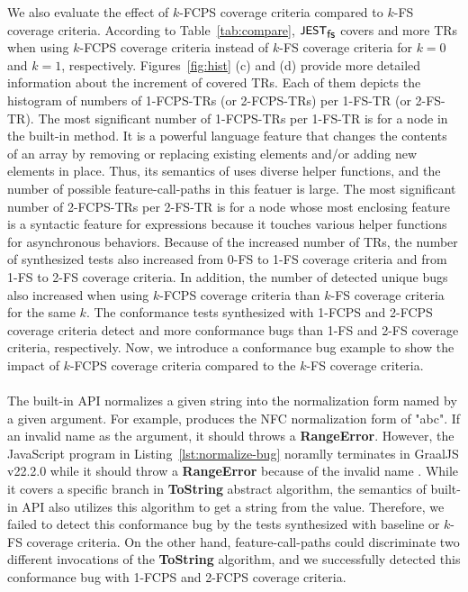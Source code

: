 We also evaluate the effect of $k$-FCPS coverage criteria compared to $k$-FS
coverage criteria.
%
According to Table~\ref{tab:compare}, $\textsf{\small JEST}_{\textsf{\small fs}}$ covers  and  more TRs when using $k$-FCPS
coverage criteria instead of $k$-FS coverage criteria for $k = 0$ and $k = 1$,
respectively.
%
Figures~\ref{fig:hist} (c) and (d) provide more detailed information about the
increment of covered TRs.
%
Each of them depicts the histogram of numbers of 1-FCPS-TRs (or 2-FCPS-TRs) per
1-FS-TR (or 2-FS-TR).
%
The most significant number of 1-FCPS-TRs per 1-FS-TR is  for a node
in the  built-in method.
%
It is a powerful language feature that changes the contents of an array by
removing or replacing existing elements and/or adding new elements in place.
%
Thus, its semantics of uses diverse helper functions, and the number of possible
feature-call-paths in this featuer is large.
%
The most significant number of 2-FCPS-TRs per 2-FS-TR is  for a node
whose most enclosing feature is a syntactic feature for 
expressions because it touches various helper functions for asynchronous
behaviors.
%
Because of the increased number of TRs, the number of synthesized tests also
increased  from 0-FS to 1-FS coverage criteria and
 from 1-FS to 2-FS coverage criteria.
%
In addition, the number of detected unique bugs also increased when using
$k$-FCPS coverage criteria than $k$-FS coverage criteria for the same $k$.
%
The conformance tests synthesized with 1-FCPS and 2-FCPS coverage criteria
detect  and  more conformance bugs than
1-FS and 2-FS coverage criteria, respectively.
%
Now, we introduce a conformance bug example to show the impact of $k$-FCPS
coverage criteria compared to the $k$-FS coverage criteria.


\paragraph{\textbf{}}
%
The  built-in API normalizes a given string
into the normalization form named by a given argument.
%
For example,  produces the NFC normalization form
of "abc".
%
If an invalid name as the argument, it should throws a \textbf{RangeError}.
%
However, the JavaScript program in Listing~\ref{lst:normalize-bug} noramlly
terminates in GraalJS v22.2.0 while it should throw a \textbf{RangeError}
because of the invalid name .
%
While it covers a specific branch in \textbf{ToString} abstract algorithm, the
semantics of  built-in API also utilizes this
algorithm to get a string from the  value.
%
Therefore, we failed to detect this conformance bug by the tests synthesized
with baseline or $k$-FS coverage criteria.
%
On the other hand, feature-call-paths could discriminate two different
invocations of the \textbf{ToString} algorithm, and we successfully detected
this conformance bug with 1-FCPS and 2-FCPS coverage criteria.

